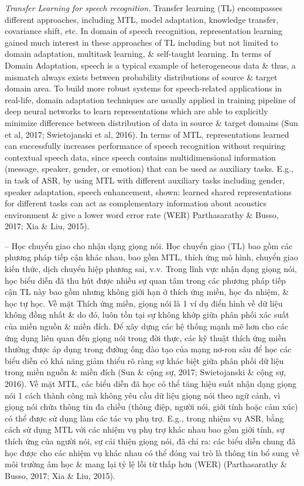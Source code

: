\documentclass{article}
\begin{document}
\begin{itemize}
\begin{itemize}
\begin{itemize}
            {\it Transfer Learning for speech recognition.} Transfer learning (TL) encompasses different approaches, including MTL, model adaptation, knowledge transfer, covariance shift, etc. In domain of speech recognition, representation learning gained much interest in these approaches of TL including but not limited to domain adaptation, multitask learning, \& self-taught learning. In terms of Domain Adaptation, speech is a typical example of heterogeneous data \& thus, a mismatch always exists between probability distributions of source \& target domain area. To build more robust systems for speech-related applications in real-life, domain adaptation techniques are usually applied in training pipeline of deep neural networks to learn representations which are able to explicitly minimize difference between distribution of data in source \& target domains (Sun et al, 2017; Swietojanski et al, 2016). In terms of MTL, representations learned can successfully increases performance of speech recognition without requiring contextual speech data, since speech contains multidimensional information (message, speaker, gender, or emotion) that can be used as auxiliary tasks. E.g., in task of ASR, by using MTL with different auxiliary tasks including gender, speaker adaptation, speech enhancement, shown: learned shared representations for different tasks can act as complementary information about acoustics environment \& give a lower word error rate (WER) Parthasarathy \& Busso, 2017; Xia \& Liu, 2015).

            -- Học chuyển giao cho nhận dạng giọng nói. Học chuyển giao (TL) bao gồm các phương pháp tiếp cận khác nhau, bao gồm MTL, thích ứng mô hình, chuyển giao kiến thức, dịch chuyển hiệp phương sai, v.v. Trong lĩnh vực nhận dạng giọng nói, học biểu diễn đã thu hút được nhiều sự quan tâm trong các phương pháp tiếp cận TL này bao gồm nhưng không giới hạn ở thích ứng miền, học đa nhiệm, \& học tự học. Về mặt Thích ứng miền, giọng nói là 1 ví dụ điển hình về dữ liệu không đồng nhất \& do đó, luôn tồn tại sự không khớp giữa phân phối xác suất của miền nguồn \& miền đích. Để xây dựng các hệ thống mạnh mẽ hơn cho các ứng dụng liên quan đến giọng nói trong đời thực, các kỹ thuật thích ứng miền thường được áp dụng trong đường ống đào tạo của mạng nơ-ron sâu để học các biểu diễn có khả năng giảm thiểu rõ ràng sự khác biệt giữa phân phối dữ liệu trong miền nguồn \& miền đích (Sun \& cộng sự, 2017; Swietojanski \& cộng sự, 2016). Về mặt MTL, các biểu diễn đã học có thể tăng hiệu suất nhận dạng giọng nói 1 cách thành công mà không yêu cầu dữ liệu giọng nói theo ngữ cảnh, vì giọng nói chứa thông tin đa chiều (thông điệp, người nói, giới tính hoặc cảm xúc) có thể được sử dụng làm các tác vụ phụ trợ. E.g., trong nhiệm vụ ASR, bằng cách sử dụng MTL với các nhiệm vụ phụ trợ khác nhau bao gồm giới tính, sự thích ứng của người nói, sự cải thiện giọng nói, đã chỉ ra: các biểu diễn chung đã học được cho các nhiệm vụ khác nhau có thể đóng vai trò là thông tin bổ sung về môi trường âm học \& mang lại tỷ lệ lỗi từ thấp hơn (WER) (Parthasarathy \& Busso, 2017; Xia \& Liu, 2015).


\end{itemize}
\end{itemize}
\end{itemize}
\end{document}
